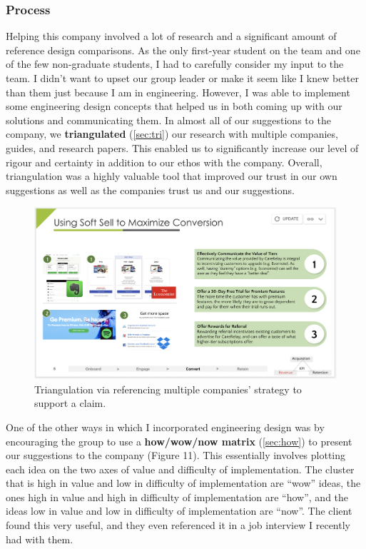 \documentclass[a4paper,12pt]{article}
\begin{document}
\subsubsection{Process}
Helping this company involved a lot of research and a significant amount of reference design comparisons. As the only first-year student on the team and one of the few non-graduate students, I had to carefully consider my input to the team. I didn’t want to upset our group leader or make it seem like I knew better than them just because I am in engineering. However, I was able to implement some engineering design concepts that helped us in both coming up with our solutions and communicating them.
In almost all of our suggestions to the company, we \textbf{triangulated} (\ref{sec:tri}) our research with multiple companies, guides, and research papers. This enabled us to significantly increase our level of rigour and certainty in addition to our ethos with the company. Overall, triangulation was a highly valuable tool that improved our trust in our own suggestions as well as the companies trust us and our suggestions.

\begin{figure}[H]
\centering
\includegraphics[width=1\textwidth]{img/image010.png}
\caption{Triangulation via referencing multiple companies' strategy to support a claim.}
\label{}
\end{figure}

One of the other ways in which I incorporated engineering design was by encouraging the group to use a \textbf{how/wow/now matrix} (\ref{sec:how}) to present our suggestions to the company (Figure 11). This essentially involves plotting each idea on the two axes of value and difficulty of implementation. The cluster that is high in value and low in difficulty of implementation are “wow” ideas, the ones high in value and high in difficulty of implementation are “how”, and the ideas low in value and low in difficulty of implementation are “now”. The client found this very useful, and they even referenced it in a job interview I recently had with them.
 
\end{document}
